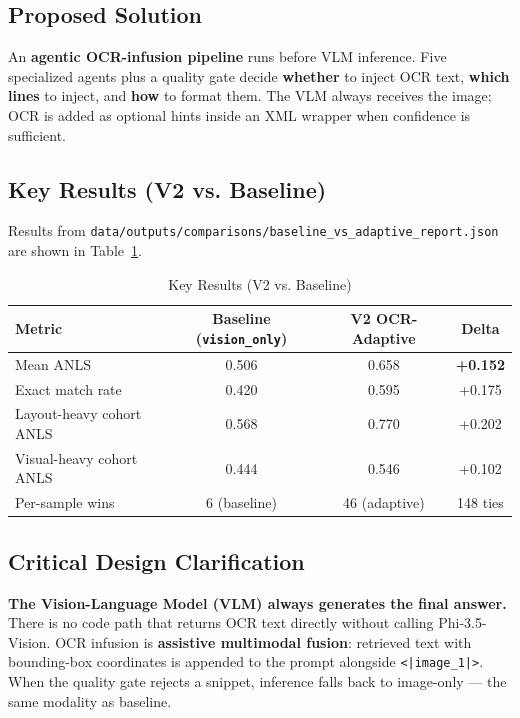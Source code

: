 \documentclass[11pt,a4paper]{article}
\begin{document}
\subsection{Proposed Solution}
An \textbf{agentic OCR-infusion pipeline} runs before VLM inference. Five specialized agents plus a quality gate decide \textbf{whether} to inject OCR text, \textbf{which lines} to inject, and \textbf{how} to format them. The VLM always receives the image; OCR is added as optional hints inside an XML wrapper when confidence is sufficient.

\subsection{Key Results (V2 vs. Baseline)}
Results from \texttt{data/outputs/comparisons/baseline\_vs\_adaptive\_report.json} are shown in Table~\ref{tab:key_results}.

\begin{table}[H]
\centering
\caption{Key Results (V2 vs. Baseline)}
\label{tab:key_results}
\begin{tabular}{|l|c|c|c|}
\hline
\textbf{Metric} & \textbf{Baseline (\texttt{vision\_only})} & \textbf{V2 OCR-Adaptive} & \textbf{Delta} \\ \hline
Mean ANLS & 0.506 & 0.658 & \textbf{+0.152} \\ \hline
Exact match rate & 0.420 & 0.595 & +0.175 \\ \hline
Layout-heavy cohort ANLS & 0.568 & 0.770 & +0.202 \\ \hline
Visual-heavy cohort ANLS & 0.444 & 0.546 & +0.102 \\ \hline
Per-sample wins & 6 (baseline) & 46 (adaptive) & 148 ties \\ \hline
\end{tabular}
\end{table}

\subsection{Critical Design Clarification}
\textbf{The Vision-Language Model (VLM) always generates the final answer.} There is no code path that returns OCR text directly without calling Phi-3.5-Vision. OCR infusion is \textbf{assistive multimodal fusion}: retrieved text with bounding-box coordinates is appended to the prompt alongside \texttt{<|image\_1|>}. When the quality gate rejects a snippet, inference falls back to image-only --- the same modality as baseline.
\end{document}
